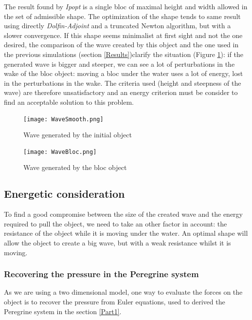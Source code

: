 \documentclass[11pt,a4paper]{article}
\begin{document}
	The result found by \textit{Ipopt} is a single bloc of maximal height and width allowed in the set of admissible shape. The optimization of the shape tends to same result using directly \textit{Dolfin-Adjoint} and a truncated Newton algorithm, but with a slower convergence. If this shape seems minimalist at first sight and not the one desired, the comparison of the wave created by this object and the one used in the previous simulations (section \ref{Results})clarify the situation (Figure \ref{WaveBloc}): if the generated wave is bigger and steeper, we can see a lot of perturbations in the wake of the bloc object: moving a bloc under the water uses a lot of energy, lost in the perturbations in the wake. The criteria used (height and steepness of the wave) are therefore unsatisfactory and an energy criterion must be consider to find an acceptable solution to this problem.	
	\begin{figure}[!h]
		\begin{minipage}[t]{0.5\linewidth}
			\centering
			\texttt{[image: WaveSmooth.png]}
			\caption{Wave generated by the initial object}
		\end{minipage}
		\hspace{10pt}
		\begin{minipage}[t]{0.5\linewidth}
			\centering
			\texttt{[image: WaveBloc.png]}
			\caption{Wave generated by the bloc object}
			\label{WaveBloc}
		\end{minipage}
	\end{figure}

\subsection{Energetic consideration}

	To find a good compromise between the size of the created wave and the energy required to pull the object, we need to take an other factor in account: the resistance of the object while it is moving under the water. An optimal shape will allow the object to create a big wave, but with a weak resistance whilst it is moving.
	
\subsubsection{Recovering the pressure in the Peregrine system}		
	 As we are using a two dimensional model, one way to evaluate the forces on the object is to recover the pressure from Euler equations, used to derived the Peregrine system in the section \ref{Part1}.
				
\end{document}
